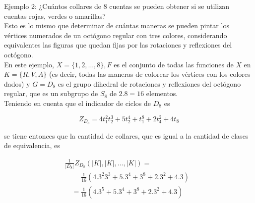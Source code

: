 \documentclass[10pt]{article}
\begin{document}
Ejemplo 2: ¿Cuántos collares de 8 cuentas se pueden obtener si se utilizan cuentas rojas, verdes o amarillas?\\
Esto es lo mismo que determinar de cuántas maneras se pueden pintar los vértices numerados de un octógono regular con tres colores, considerando equivalentes las figuras que quedan fijas por las rotaciones y reflexiones del octógono.\\
En este ejemplo, $X=\{1,2, \ldots, 8\}, F$ es el conjunto de todas las funciones de $X$ en $K=\{R, V, A\}$ (es decir, todas las maneras de colorear los vértices con los colores dados) y $G=D_{8}$ es el grupo dihedral de rotaciones y reflexiones del octógono regular, que es un subgrupo de $S_{8}$ de $2.8=16$ elementos.\\
Teniendo en cuenta que el indicador de ciclos de $D_{8}$ es

$$
Z_{D_{8}}=4 t_{1}^{2} t_{2}^{3}+5 t_{2}^{4}+t_{1}^{8}+2 t_{4}^{2}+4 t_{8}
$$

se tiene entonces que la cantidad de collares, que es igual a la cantidad de clases de equivalencia, es

$$
\begin{aligned}
& \frac{1}{\left|D_{8}\right|} Z_{D_{8}}(|K|,|K|, \ldots,|K|)= \\
& \quad=\frac{1}{16}\left(4.3^{2} 3^{3}+5.3^{4}+3^{8}+2.3^{2}+4.3\right)= \\
& \quad=\frac{1}{16}\left(4.3^{5}+5.3^{4}+3^{8}+2.3^{2}+4.3\right)
\end{aligned}
$$
\end{document}

